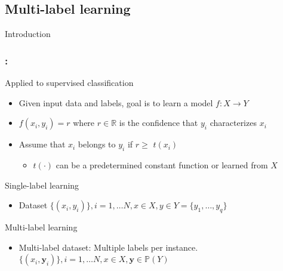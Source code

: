 \documentclass{beamer}
\begin{document}
\subsection{Multi-label learning}
\begin{frame}
\Huge{\centerline{Introduction}}
\end{frame}
\begin{frame}
\frametitle{\insertsection : \insertsubsection}
Applied to supervised classification
\begin{itemize}
\item Given input data and labels, goal is to learn a model $f: X \rightarrow Y$ 
\item $f(x_i, y_i) = r$ where $r\in \mathbb{R}$ is the confidence that $y_i$ characterizes $x_i$
\item Assume that $x_i$ belongs to $y_i$ if $r \ge $ $t(x_i)$
\begin{itemize}
  \item $t(\cdot)$ can be a predetermined constant function or learned from $X$
\end{itemize}
\end{itemize}

Single-label learning
\begin{itemize}
	\item Dataset $\{ (x_i, y_i)\}, i = 1, \dots N, x \in X, y \in Y=\{y_1,\dots,y_q\}$
\end{itemize}

Multi-label learning
\begin{itemize}
\item Multi-label dataset: Multiple labels per instance. $\{ (x_i, \bm{y}_i)\}, i = 1, \dots N, x \in X, \bm{y} \in \mathbb{P}(Y)$

\end{itemize}
\end{frame}
\end{document}
